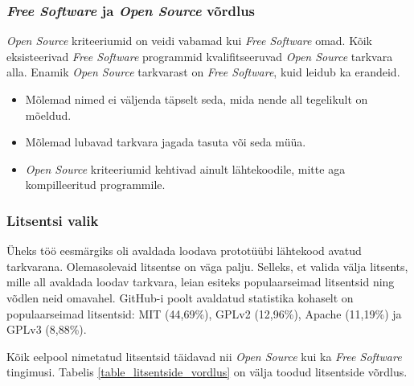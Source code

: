 \documentclass[a4paper,12pt]{article} %
\begin{document}
\subsubsection{\textit{Free Software} ja \textit{Open Source} võrdlus}
\textit{Open Source} kriteeriumid on veidi vabamad kui \textit{Free Software} omad. Kõik eksisteerivad \textit{Free Software} programmid kvalifitseeruvad \textit{Open Source} tarkvara alla. Enamik \textit{Open Source} tarkvarast on \textit{Free Software}, kuid leidub ka erandeid.
\cite{OS_VS_FS}
\begin{itemize}
\item Mõlemad nimed ei väljenda täpselt seda, mida nende all tegelikult on mõeldud.
\item Mõlemad lubavad tarkvara jagada tasuta või seda müüa.
\item \textit{Open Source} kriteeriumid kehtivad ainult lähtekoodile, mitte aga kompilleeritud programmile.
\end{itemize}
\subsubsection{Litsentsi valik}
Üheks töö eesmärgiks oli avaldada loodava prototüübi lähtekood avatud tarkvarana. Olemasolevaid litsentse on väga palju. Selleks, et valida välja litsents, mille all avaldada loodav tarkvara, leian esiteks populaarseimad litsentsid ning võdlen neid omavahel.
GitHub-i poolt avaldatud statistika kohaselt on populaarseimad litsentsid: MIT (44,69\%), GPLv2 (12,96\%), Apache (11,19\%) ja GPLv3 (8,88\%). \cite{GitHub_Opensource_Licence_Usage}\par
Kõik eelpool nimetatud litsentsid täidavad nii \textit{Open Source} kui ka \textit{Free Software} tingimusi. Tabelis \ref{table_litsentside_vordlus} on välja toodud litsentside võrdlus.
\end{document}
